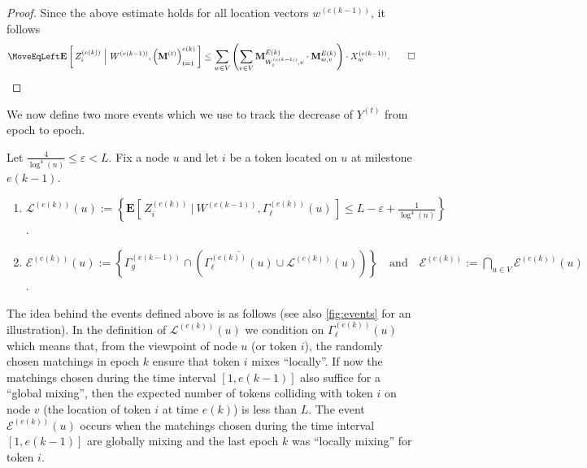 \documentclass[twoside,leqno]{article}
\newcommand*{\cE}{\mathcal{E}}
\newcommand*{\cL}{\mathcal{L}}
\newcommand{\Ex}[1]{\mathbf{E} \left[\,#1\,\right]}
\newcommand{\M}{\mathbf{M}}
\DeclareMathOperator{\1}{\mathbf{1}}
\numberwithin{equation}{section}
\let\epsilon\varepsilon
\newcommand{\newL}{L}
\begin{document}
\begin{proof}
Since the above estimate holds for all location vectors $w^{(e(k-1))}$, it follows 
\begin{align*}
\MoveEqLeft
\Ex{ Z_i^{(e(k))} ~\Big|~ W^{(e(k-1))},\left(\M^{(t)}\right)_{t=1}^{e(k)}}
\le
\sum_{w\in V} \left(\sum_{v\in V} \M_{W_i^{(e(k-1))},v}^{E(k)}\cdot \M_{w,v}^{E(k)}\right) \cdot X_w^{(e(k-1))}. 
\qed
\end{align*}
    
\end{proof}
We now define two more events which we use to track the decrease of $Y^{(t)}$ from epoch to epoch.



\begin{definition}\label{eq:LEvent}
Let $\frac{4}{\log^4 (n)} \leq \epsilon<\newL$. Fix a node $u$ and let $i$ be a token located on $u$ at milestone $e(k-1)$.

\begin{enumerate}
\item $ \displaystyle \cL^{(e(k))}(u):= \left\{ \Ex{ Z_i^{(e(k))} ~\Big|~ W^{(e(k-1))},\Gamma_{\ell}^{(e(k))}(u) } \leq \newL-\epsilon + \frac{1}{\log^4(n)}\right\} $.
\item
$\displaystyle
\cE^{(e(k))}(u):=\left\{
\Gamma_{g}^{(e(k-1))} \cap \left( \overline{\Gamma_{\ell}^{(e(k))}(u)}
\cup
\cL^{(e(k))}(u) \right)\right\}
\quad \text{and} \quad \cE^{(e(k))}:= \bigcap_{u\in V} \cE^{(e(k))}(u)
$.
\end{enumerate}
\end{definition}


The idea behind the events defined above is as follows (see also \cref{fig:events} for an illustration).
In the definition of $\cL^{(e(k))}(u)$ we condition on $\Gamma_{\ell}^{(e(k))}(u) $ which means that, from the viewpoint of node $u$ (or token $i$), the randomly chosen matchings in epoch $k$ ensure that token $i$ mixes ``locally''. If now the matchings chosen during the time interval $[1,e(k-1)]$ also suffice for a ``global mixing'', then the expected number of tokens colliding with token $i$ on node $v$ (the location of token $i$ at time $e(k)$) is less than $L$.
The event $\cE^{(e(k))}(u)$ occurs when the matchings chosen during the time interval $[1,e(k-1)]$ are globally mixing and the last epoch $k$ was ``locally mixing'' for token $i$. 
\end{document}
